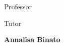 \begin{center}
\vspace{1\baselineskip}
    {Professor \par}
\vspace{0.4\baselineskip}
    {{\large \bf \mysupervisor} \par}
\vspace{1\baselineskip}
    {Tutor \par}
\vspace{0.4\baselineskip}
    {{\large \bf Annalisa Binato} \par}
\vspace*{1ex}
 \end{center}
